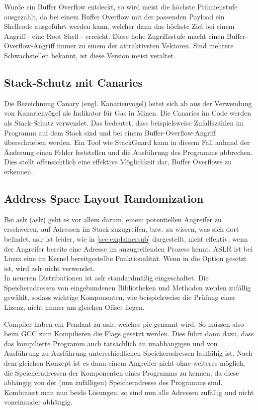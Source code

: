 Wurde ein Buffer Overflow entdeckt, so wird meist die höchste Prämienstufe ausgezahlt, da bei einem
Buffer Overflow mit der passenden Payload ein Shellcode ausgeführt werden kann, welcher dann das
höchste Ziel bei einem Angriff - eine Root Shell - erreicht.
Diese hohe Zugriffsstufe macht einen Buffer-Overflow-Angriff immer zu einem der attraktivsten Vektoren. 
Sind mehrere Schwachstellen bekannt, ist diese Version meist veraltet. 
\pagebreak

\subsection{Stack-Schutz mit Canaries} \label{sec:canaries}
Die Bezeichnung Canary (engl. Kanarienvogel) leitet sich ab aus der Verwendung von Kanarienvögel als
Indikator für Gas in Minen. Die Canaries im Code werden als Stack-Schutz verwendet. Das bedeutet,
dass beispielsweise Zufallszahlen im Programm auf dem Stack sind und bei einem Buffer-Overflow-Angriff
überschrieben werden. Ein Tool wie StackGuard kann in diesem Fall anhand der Änderung einen Fehler feststellen und
die Ausführung des Programms abbrechen. Dies stellt offensichtlich eine effektive Möglichkeit dar,
Buffer Overflows zu erkennen.

\subsection{Address Space Layout Randomization} \label{sec:aslr}
Bei \acrlong*{aslr} (\acrshort*{aslr}) geht es vor allem darum, einem potentiellen Angreifer zu erschweren,
auf Adressen im Stack zuzugreifen, bzw. zu wissen, was sich dort befindet.
\gls*{aslr} ist leider, wie in \autoref{sec:explainersub} dargestellt, nicht effektiv, wenn der Angreifer
bereits eine Adresse im anzugreifenden Prozess kennt.
ASLR ist bei Linux eine im Kernel bereitgestellte Funktionalität.
Wenn in  die Option  gesetzt ist,
wird \gls*{aslr}  nicht verwendet. \cite{aslrandrew} \\
In neueren Distributionen ist \gls*{aslr} standardmäßig eingeschaltet.
Die Speicheradressen von eingebundenen Bibliotheken und Methoden werden
zufällig gewählt, sodass wichtige Komponenten, wie beispielsweise die
Prüfung einer Lizenz, nicht immer am gleichen Offset liegen.

Compiler haben ein Pendant zu \gls*{aslr}, welches \gls*{pie}
genannt wird. So müssen also beim GCC zum Kompilieren die Flags 
gesetzt werden. Dies führt dann dazu, dass das kompilierte Programm auch tatsächlich an
unabhängigen und von Ausführung zu Ausführung unterschiedlichen Speicheradressen lauffähig
ist.
Nach dem gleichen Konzept ist es dann einem Angreifer nicht ohne weiteres möglich, die
Speicheradressen der Komponenten eines Programms zu kennen, da diese abhängig
von der (nun zufälligen) Speicheradresse des Programms sind. Kombiniert man nun beide Lösungen,
so sind nun alle Adressen zufällig und nicht voneinander abhängig.

